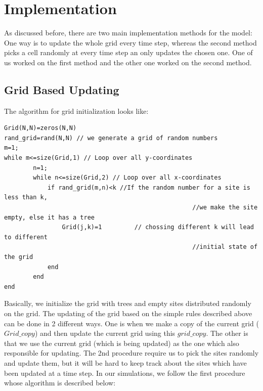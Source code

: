 \documentclass[11pt]{article}
\begin{document}
\section{Implementation}
As discussed before, there are two main implementation methods for the model: One way is to update the whole grid every time step, whereas the second method picks a cell randomly at every time step an only updates the chosen one. One of us worked on the first method and the other one worked on the second method.

\subsection{Grid Based Updating}
The algorithm for grid initialization looks like:
\begin{verbatim}
Grid(N,N)=zeros(N,N)
rand_grid=rand(N,N) // we generate a grid of random numbers
m=1;
while m<=size(Grid,1) // Loop over all y-coordinates
		n=1;
		while n<=size(Grid,2) // Loop over all x-coordinates
			if rand_grid(m,n)<k //If the random number for a site is less than k, 
													//we make the site empty, else it has a tree
				Grid(j,k)=1   		// chossing different k will lead to different 
													//initial state of the grid
			end
		end
end
\end{verbatim}
Basically, we initialize the grid with trees and empty sites distributed randomly on the grid.
The updating of the grid based on the simple rules described above can be done in 2 different ways. One is when we make a copy of the current grid ($Grid\_copy$) and then update the current grid using this $grid\_copy$. The other is that we use the current grid (which is being updated) as the one which also responsible for updating. The 2nd procedure require us to pick the sites randomly and update them, but it will be hard to keep track about the sites which have been updated at a time step. In our simulations, we follow the first procedure whose algorithm is described below: 
\end{document}
